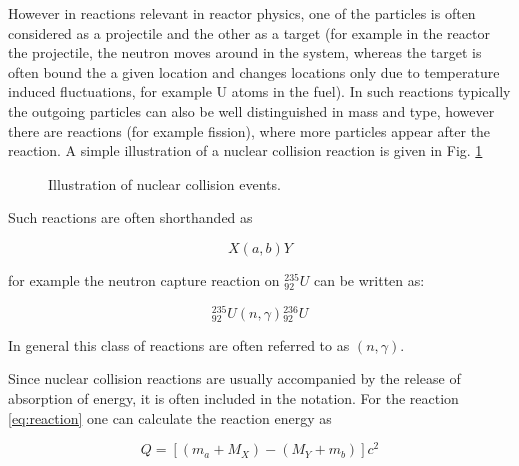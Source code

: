 However in reactions relevant in reactor physics, one of the particles is often considered as a projectile and the other as a target (for example in the reactor the projectile, the neutron moves around in the system, whereas the target is often bound the a given location and changes locations only due to temperature induced fluctuations, for example U atoms in the fuel). In such reactions typically the outgoing particles can also be well distinguished in mass and type, however there are reactions (for example fission), where more particles appear after the reaction. A simple illustration of a nuclear collision reaction is given in Fig. \ref{fig:reactions}

\begin{figure}[ht!]
\protect {}\protect
\caption{\label{fig:reactions} \footnotesize{Illustration of nuclear collision events.}}
\end{figure}

Such reactions are often shorthanded as

\[
X(a,b)Y
\]

for example the neutron capture reaction on ${}_{92}^{235}U$ can be written as:

\[
{}_{92}^{235}U(n,\gamma){}_{92}^{236}U
\]

In general this class of reactions are often referred to as $(n,\gamma)$.

Since nuclear collision reactions are usually accompanied by the release of absorption of energy, it is often included in the notation. For the reaction \eqref{eq:reaction} one can calculate the reaction energy as

\begin{equation}\label{eq:reactionQ}
Q=[(m_a+M_X)-(M_Y+m_b)]c^2
\end{equation}

